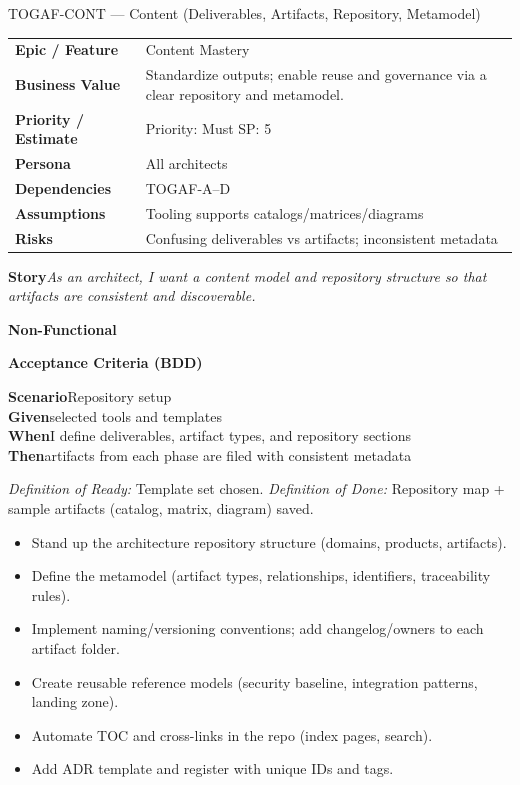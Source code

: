 \documentclass[11pt,a4paper]{article}
\newcommand{\Tag}[1]{%
  \tcbox[
    on line, rounded corners,
    colback=chipback, colframe=chipborder,
    boxrule=0.3pt, left=5pt, right=5pt, top=2pt, bottom=2pt]{\footnotesize #1}%
}
\newcommand{\Field}[2]{\textbf{#1} & #2\\}
\newcommand{\StoryText}[1]{\textbf{Story}\quad \textit{#1}}
\newcommand{\NonFunctional}[1]{\textbf{Non-Functional}\quad #1}
\newcommand{\BDDHeader}{\textbf{Acceptance Criteria (BDD)}}
\newcommand{\BDDRow}[2]{\textbf{#1}\quad #2}
\newcommand{\DOR}[1]{\textit{\footnotesize Definition of Ready:} #1}
\newcommand{\DOD}[1]{\textit{\footnotesize Definition of Done:} #1}
\newcommand{\Task}[1]{\item[$\square$] #1}
\providecommand{\Field}[2]{\textbf{#1} & #2\\}
\begin{document}
\begin{StoryCard}{TOGAF-CONT — Content (Deliverables, Artifacts, Repository, Metamodel)}
\begin{tabularx}{\textwidth}{L Y}
  \Field{Epic / Feature}{Content Mastery}
  \Field{Business Value}{Standardize outputs; enable reuse and governance via a clear repository and metamodel.}
  \Field{Priority / Estimate}{Priority: Must \quad\quad SP: 5}
  \Field{Persona}{All architects}
  \Field{Dependencies}{TOGAF-A–D}
  \Field{Assumptions}{Tooling supports catalogs/matrices/diagrams}
  \Field{Risks}{Confusing deliverables vs artifacts; inconsistent metadata}
\end{tabularx}

\vspace{4pt}
\StoryText{As an architect, I want a content model and repository structure so that artifacts are consistent and discoverable.}

\vspace{2pt}
\NonFunctional{\Tag{Findability} \Tag{Consistency} \Tag{Reuse}}

\vspace{6pt}
\BDDHeader

\BDDRow{Scenario}{Repository setup}\\
\BDDRow{Given}{selected tools and templates}\\
\BDDRow{When}{I define deliverables, artifact types, and repository sections}\\
\BDDRow{Then}{artifacts from each phase are filed with consistent metadata}

\vspace{6pt}
\DOR{Template set chosen.}\quad
\DOD{Repository map + sample artifacts (catalog, matrix, diagram) saved.}
\end{StoryCard}
\begin{TasksBox}
\begin{itemize}[label={}, leftmargin=*]
\Task{Stand up the architecture repository structure (domains, products, artifacts).}
\Task{Define the metamodel (artifact types, relationships, identifiers, traceability rules).}
\Task{Implement naming/versioning conventions; add changelog/owners to each artifact folder.}
\Task{Create reusable reference models (security baseline, integration patterns, landing zone).}
\Task{Automate TOC and cross-links in the repo (index pages, search).}
\Task{Add ADR template and register with unique IDs and tags.}
\end{itemize}
\end{TasksBox}
\end{document}

